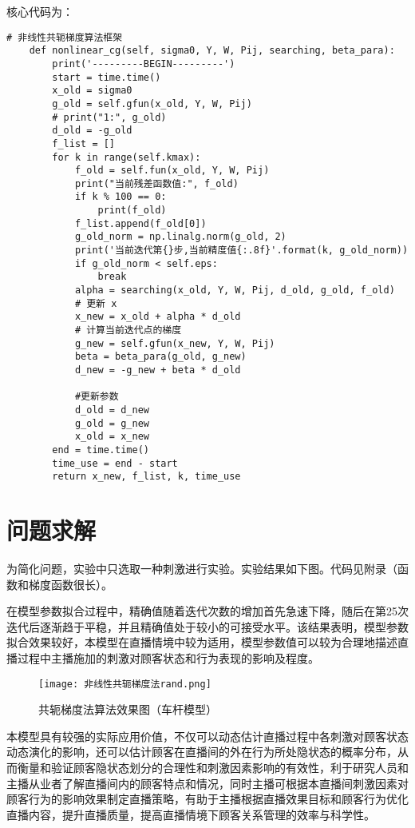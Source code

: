 核心代码为：
\begin{lstlisting}
# 非线性共轭梯度算法框架
    def nonlinear_cg(self, sigma0, Y, W, Pij, searching, beta_para):
        print('---------BEGIN---------')
        start = time.time()
        x_old = sigma0
        g_old = self.gfun(x_old, Y, W, Pij)
        # print("1:", g_old)
        d_old = -g_old
        f_list = []
        for k in range(self.kmax):
            f_old = self.fun(x_old, Y, W, Pij)
            print("当前残差函数值:", f_old)
            if k % 100 == 0:
                print(f_old)
            f_list.append(f_old[0])
            g_old_norm = np.linalg.norm(g_old, 2)
            print('当前迭代第{}步,当前精度值{:.8f}'.format(k, g_old_norm))
            if g_old_norm < self.eps:
                break
            alpha = searching(x_old, Y, W, Pij, d_old, g_old, f_old)
            # 更新 x
            x_new = x_old + alpha * d_old
            # 计算当前迭代点的梯度
            g_new = self.gfun(x_new, Y, W, Pij)
            beta = beta_para(g_old, g_new)
            d_new = -g_new + beta * d_old

            #更新参数
            d_old = d_new
            g_old = g_new
            x_old = x_new
        end = time.time()
        time_use = end - start
        return x_new, f_list, k, time_use
\end{lstlisting}
\section{问题求解}
为简化问题，实验中只选取一种刺激进行实验。实验结果如下图。代码见附录（函数和梯度函数很长）。

在模型参数拟合过程中，精确值随着迭代次数的增加首先急速下降，随后在第25次迭代后逐渐趋于平稳，并且精确值处于较小的可接受水平。该结果表明，模型参数拟合效果较好，本模型在直播情境中较为适用，模型参数值可以较为合理地描述直播过程中主播施加的刺激对顾客状态和行为表现的影响及程度。
\begin{figure}[hbt]
    \centering
    \texttt{[image: 非线性共轭梯度法rand.png]}
	\vspace{-0.5cm}
    \caption{共轭梯度法算法效果图（车杆模型）}
    \label{gonge}
\end{figure}

本模型具有较强的实际应用价值，不仅可以动态估计直播过程中各刺激对顾客状态动态演化的影响，还可以估计顾客在直播间的外在行为所处隐状态的概率分布，从而衡量和验证顾客隐状态划分的合理性和刺激因素影响的有效性，利于研究人员和主播从业者了解直播间内的顾客特点和情况，同时主播可根据本直播间刺激因素对顾客行为的影响效果制定直播策略，有助于主播根据直播效果目标和顾客行为优化直播内容，提升直播质量，提高直播情境下顾客关系管理的效率与科学性。


